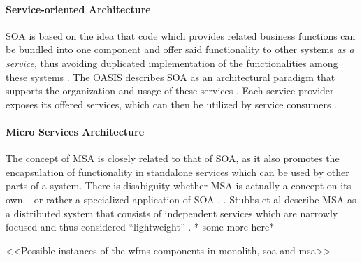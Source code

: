   \paragraph{Service-oriented Architecture} %
  \label{par:service_oriented_architecture}
    \ac{SOA} is based on the idea that code which provides related business functions can be bundled into one component and offer said functionality to other systems \emph{as a service}, thus avoiding duplicated implementation of the functionalities among these systems \cite[p.8]{Hohpe2004Enterprise}.
    The \ac{OASIS} describes \ac{SOA} as an architectural paradigm that supports the organization and usage of these services \cite{Standards2006Reference}. Each service provider exposes its offered services, which can then be utilized by service consumers \cite{Strimbei2015Software}.

  \paragraph{Micro Services Architecture} %
  \label{par:micro_services_architecture}
    The concept of \ac{MSA} is closely related to that of \ac{SOA}, as it also promotes the encapsulation of functionality in standalone services which can be used by other parts of a system. There is disabiguity whether \ac{MSA} is actually a concept on its own -- or rather a specialized application of \ac{SOA} \cite[p.~35]{Stubbs2015Distributed}, \cite[p.~17]{Strimbei2015Software}.
    Stubbs et al describe \ac{MSA} as a distributed system that consists of independent services which are   narrowly focused and thus considered ``lightweight'' \cite[p.~35]{Stubbs2015Distributed}.
    * some more here*

  <<Possible instances of the wfms components in monolith, soa and msa>>

